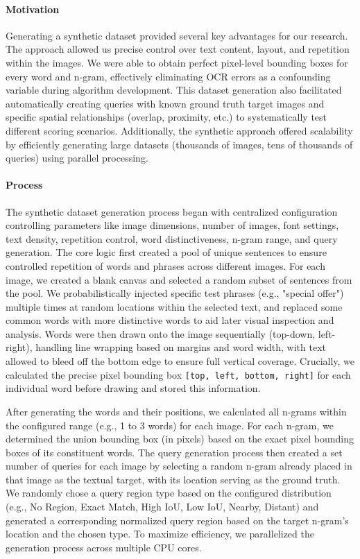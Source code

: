 \documentclass[manuscript,screen]{acmart}
\begin{document}
\paragraph{Motivation} Generating a synthetic dataset provided several key advantages for our research. The approach allowed us precise control over text content, layout, and repetition within the images. We were able to obtain perfect pixel-level bounding boxes for every word and n-gram, effectively eliminating OCR errors as a confounding variable during algorithm development. This dataset generation also facilitated automatically creating queries with known ground truth target images and specific spatial relationships (overlap, proximity, etc.) to systematically test different scoring scenarios. Additionally, the synthetic approach offered scalability by efficiently generating large datasets (thousands of images, tens of thousands of queries) using parallel processing.

\paragraph{Process} The synthetic dataset generation process began with centralized configuration controlling parameters like image dimensions, number of images, font settings, text density, repetition control, word distinctiveness, n-gram range, and query generation. The core logic first created a pool of unique sentences to ensure controlled repetition of words and phrases across different images. For each image, we created a blank canvas and selected a random subset of sentences from the pool. We probabilistically injected specific test phrases (e.g., "special offer") multiple times at random locations within the selected text, and replaced some common words with more distinctive words to aid later visual inspection and analysis. Words were then drawn onto the image sequentially (top-down, left-right), handling line wrapping based on margins and word width, with text allowed to bleed off the bottom edge to ensure full vertical coverage. Crucially, we calculated the precise pixel bounding box \verb|[top, left, bottom, right]| for each individual word before drawing and stored this information.

After generating the words and their positions, we calculated all n-grams within the configured range (e.g., 1 to 3 words) for each image. For each n-gram, we determined the union bounding box (in pixels) based on the exact pixel bounding boxes of its constituent words. The query generation process then created a set number of queries for each image by selecting a random n-gram already placed in that image as the textual target, with its location serving as the ground truth. We randomly chose a query region type based on the configured distribution (e.g., No Region, Exact Match, High IoU, Low IoU, Nearby, Distant) and generated a corresponding normalized query region based on the target n-gram's location and the chosen type. To maximize efficiency, we parallelized the generation process across multiple CPU cores.
\end{document}
